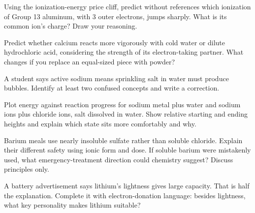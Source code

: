 \begin{sikaoti}
\item Using the ionization-energy price cliff, predict without references which ionization of Group 13 aluminum, with 3 outer electrons, jumps sharply. What is its common ion's charge? Draw your reasoning.
\item Predict whether calcium reacts more vigorously with cold water or dilute hydrochloric acid, considering the strength of its electron-taking partner. What changes if you replace an equal-sized piece with powder?
\item A student says active sodium means sprinkling salt in water must produce bubbles. Identify at least two confused concepts and write a correction.
\item Plot energy against reaction progress for sodium metal plus water and sodium ions plus chloride ions, salt dissolved in water. Show relative starting and ending heights and explain which state sits more comfortably and why.
\item Barium meals use nearly insoluble sulfate rather than soluble chloride. Explain their different safety using ionic form and dose. If soluble barium were mistakenly used, what emergency-treatment direction could chemistry suggest? Discuss principles only.
\item A battery advertisement says lithium's lightness gives large capacity. That is half the explanation. Complete it with electron-donation language: besides lightness, what key personality makes lithium suitable?
\end{sikaoti}
